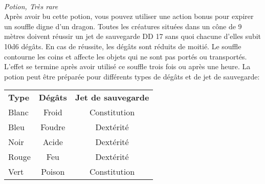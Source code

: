 \\
{\small \it Potion, Très rare}\\
Après avoir bu cette potion, vous pouvez utiliser une action bonus pour expirer 
un souffle digne d'un dragon. Toutes les créatures situées dans un cône de 
9 mètres doivent réussir un jet de sauvegarde DD 17 sans quoi chacune d'elles 
subit 10d6 dégâts. En cas de réussite, les dégâts sont réduits de moitié. Le 
souffle contourne les coins et affecte les objets qui ne sont pas portés ou 
transportés. L'effet se termine après avoir utilisé ce souffle trois fois ou 
après une heure. La potion peut être préparée pour différents types de dégâts 
et de jet de sauvegarde: 

\begin{center}
\setlength{\tabcolsep}{4pt}
\begin{tabular}{lcc}
\bf Type & \bf Dégâts & \bf Jet de sauvegarde \\
   \rowcolor{LightCyan}
Blanc & Froid & Constitution \\
Bleu & Foudre & Dextérité \\
   \rowcolor{LightCyan}
Noir & Acide & Dextérité \\
Rouge & Feu & Dextérité \\
   \rowcolor{LightCyan}
Vert & Poison & Constitution \\
\end{tabular}
\end{center}

